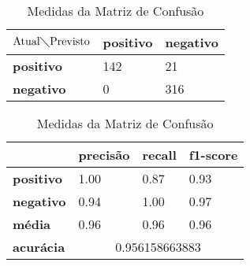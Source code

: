 \begin{table}[h!]
\centering
\begin{minipage}[b]{0.45\linewidth}
\caption{Matriz de Confusão Binário: \textit{Naive Bayes}}
\label{tab:mcb-nb}
\begin{tabular}{|l|l|l|}
\hline
$\textrm{Atual}\diagdown\textrm{Previsto}$ & \textbf{positivo} & \textbf{negativo}\\ \hline
\textbf{positivo} & 142 & 21\\ \hline
\textbf{negativo} & 0 & 316\\ \hline
\end{tabular}
\end{minipage}
\hspace{0.5cm}
\begin{minipage}[b]{0.45\linewidth}

\centering
\caption{Medidas da Matriz de Confusão}
\label{tab:mmcb-nb}
\begin{tabular}{|l|l|l|l|}
\hline
         & \textbf{precisão} & \textbf{recall} & \textbf{f1-score} \\ \hline
\textbf{positivo} & 1.00     & 0.87   & 0.93     \\ \hline
\textbf{negativo} & 0.94     & 1.00   & 0.97     \\ \hline
\textbf{média} & 0.96     & 0.96   & 0.96     \\ \hline
\textbf{acurácia} & \multicolumn{3}{|c|}{0.956158663883}\\ \hline
\end{tabular}
\end{minipage}
\end{table}

